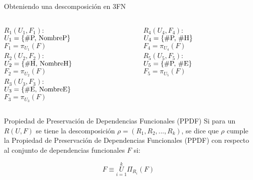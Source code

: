 \begin{frame}{Obteniendo una descomposici\'on en 3FN}

    \centering
    \begin{columns}[T]
        \begin{column}{0.48\linewidth}
            $R_1(U_1,F_1)$:\\
            \indent $U_1 = \{\textnormal{\#P, NombreP}\}$\\
            \indent $F_1 = \pi_{U_1}(F)$\\[2mm]
            $R_2(U_2,F_2)$:\\
            \indent $U_2 = \{\textnormal{\#H, NombreH}\}$\\
            \indent $F_2 = \pi_{U_2}(F)$\\[2mm]
            $R_3(U_3,F_3)$:\\
            \indent $U_3 = \{\textnormal{\#E, NombreE}\}$\\
            \indent $F_3 = \pi_{U_3}(F)$
        \end{column}
    
    
        \begin{column}{0.48\linewidth}
            $R_4(U_4,F_4)$:\\
            \indent $U_4 = \{\textnormal{\#P, \#H}\}$\\
            \indent $F_4 = \pi_{U_4}(F)$\\[2mm]
            $R_5(U_5,F_5)$:\\
            \indent $U_5 = \{\textnormal{\#P, \#E}\}$\\
            \indent $F_5 = \pi_{U_5}(F)$
        \end{column}
        
    \end{columns}

\end{frame}

\begin{frame}{Propiedad de Preservaci\'on de Dependencias Funcionales (PPDF)}
    Si para un $R(U,F)$ se tiene la descomposici\'on $\rho = (R_1,R_2,...,R_k)$,
    se dice que $\rho$ cumple la Propiedad de Preservaci\'on de Dependencias Funcionales (PPDF)
    con respecto al conjunto de dependencias funcionales $F$ si:

    $$
        F \equiv \overset{k}{\underset{i=1}{U}} \Pi_{R_i}(F) 
    $$
\end{frame}

